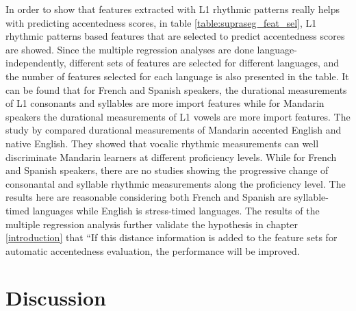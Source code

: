 In order to show that features extracted with L1 rhythmic patterns really helps with predicting accentedness scores, in table \ref{table:supraseg_feat_sel}, L1 rhythmic patterns based features that are selected to predict accentedness scores are showed. Since the multiple regression analyses are done language-independently, different sets of features are selected for different languages, and the number of features selected for each language is also presented in the table. It can be found that for French and Spanish speakers, the durational measurements of L1 consonants and syllables are more import features while for Mandarin speakers the durational measurements of L1 vowels are more import features. The study by \cite{li2014l2} compared durational measurements of Mandarin accented English and native English. They showed that vocalic rhythmic measurements can well discriminate Mandarin learners at different proficiency levels. While for French and Spanish speakers, there are no studies showing the progressive change of consonantal and syllable rhythmic measurements along the proficiency level. The results here are reasonable considering both French and Spanish are syllable-timed languages while English is stress-timed languages. The results of the multiple regression analysis further validate the hypothesis in chapter \ref{introduction} that ``If this distance information is added to the feature sets for automatic accentedness evaluation, the performance will be improved.

\section{Discussion}


